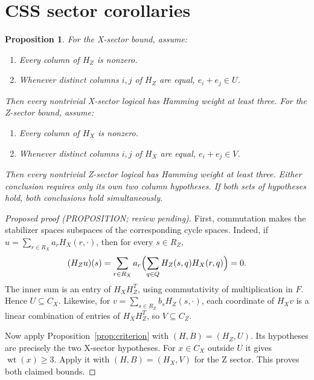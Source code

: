 \documentclass{article}
\newtheorem{proposition}{Proposition}
\DeclareMathOperator{\wt}{wt}
\begin{document}
\section{CSS sector corollaries}\label{sec:css}

\begin{proposition}\label{prop:css}
For the X-sector bound, assume:
\begin{enumerate}
  \item Every column of \(H_Z\) is nonzero.
  \item Whenever distinct columns \(i, j\) of \(H_Z\) are equal, \(e_i + e_j \in U\).
\end{enumerate}
Then every nontrivial X-sector logical has Hamming weight at least three. For the Z-sector
bound, assume:
\begin{enumerate}
  \item Every column of \(H_X\) is nonzero.
  \item Whenever distinct columns \(i, j\) of \(H_X\) are equal, \(e_i + e_j \in V\).
\end{enumerate}
Then every nontrivial Z-sector logical has Hamming weight at least three. Either
conclusion requires only its own two column hypotheses. If both sets of hypotheses hold,
both conclusions hold simultaneously.
\end{proposition}

\begin{proof}[Proposed proof (PROPOSITION; review pending)]
  First, commutation makes the stabilizer spaces subspaces of the corresponding cycle
  spaces. Indeed, if \(u = \sum_{r \in R_X} a_r H_X(r, \cdot)\), then for every
  \(s \in R_Z\),
  \begin{equation}
    (H_Z u)(s) = \sum_{r \in R_X} a_r
      \Bigl(\sum_{q \in Q} H_Z(s, q) H_X(r, q)\Bigr) = 0.
  \end{equation}
  The inner sum is an entry of \(H_X H_Z^T\), using commutativity of multiplication in
  \(F\). Hence \(U \subseteq C_X\). Likewise, for \(v = \sum_{s \in R_Z} b_s H_Z(s, \cdot)\),
  each coordinate of \(H_X v\) is a linear combination of entries of \(H_X H_Z^T\), so
  \(V \subseteq C_Z\).

  Now apply Proposition~\ref{prop:criterion} with \((H, B) = (H_Z, U)\). Its hypotheses are
  precisely the two X-sector hypotheses. For \(x \in C_X\) outside \(U\) it gives
  \(\wt(x) \ge 3\). Apply it with \((H, B) = (H_X, V)\) for the Z sector. This proves both
  claimed bounds.
\end{proof}
\end{document}
